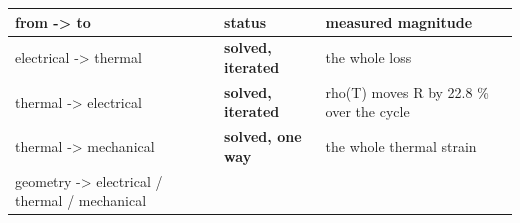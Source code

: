 \documentclass[10pt,]{article}
\begin{document}
\begin{longtable}[]{@{}lll@{}}
\toprule
\begin{minipage}[b]{0.30\columnwidth}\raggedright
from -\textgreater{} to\strut
\end{minipage} & \begin{minipage}[b]{0.30\columnwidth}\raggedright
status\strut
\end{minipage} & \begin{minipage}[b]{0.30\columnwidth}\raggedright
measured magnitude\strut
\end{minipage}\tabularnewline
\midrule
\endhead
\begin{minipage}[t]{0.30\columnwidth}\raggedright
electrical -\textgreater{} thermal\strut
\end{minipage} & \begin{minipage}[t]{0.30\columnwidth}\raggedright
\textbf{solved, iterated}\strut
\end{minipage} & \begin{minipage}[t]{0.30\columnwidth}\raggedright
the whole loss\strut
\end{minipage}\tabularnewline
\begin{minipage}[t]{0.30\columnwidth}\raggedright
thermal -\textgreater{} electrical\strut
\end{minipage} & \begin{minipage}[t]{0.30\columnwidth}\raggedright
\textbf{solved, iterated}\strut
\end{minipage} & \begin{minipage}[t]{0.30\columnwidth}\raggedright
rho(T) moves R by 22.8 \% over the cycle\strut
\end{minipage}\tabularnewline
\begin{minipage}[t]{0.30\columnwidth}\raggedright
thermal -\textgreater{} mechanical\strut
\end{minipage} & \begin{minipage}[t]{0.30\columnwidth}\raggedright
\textbf{solved, one way}\strut
\end{minipage} & \begin{minipage}[t]{0.30\columnwidth}\raggedright
the whole thermal strain\strut
\end{minipage}\tabularnewline
\begin{minipage}[t]{0.30\columnwidth}\raggedright
geometry -\textgreater{} electrical / thermal / mechanical\strut
\end{minipage} & \begin{minipage}[t]{0.30\columnwidth}\raggedright

\end{minipage}
\end{longtable}
\end{document}
